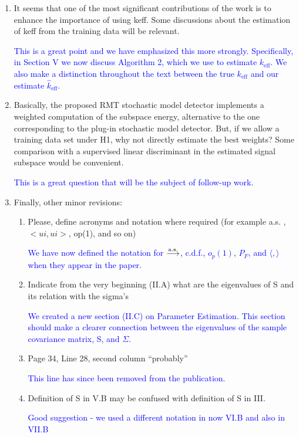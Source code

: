 \documentclass[11pt]{article}
\begin{document}
\begin{enumerate}
\item It seems that one of the most significant contributions of the work is to enhance the importance of using keff. Some discussions about the estimation of keff from the training data will be relevant.

\textcolor{blue}{This is a great point and we have emphasized this more strongly. Specifically, in Section V we now discuss Algorithm 2, which we use to estimate $k_{\text{eff}}$. We also make a distinction throughout the text between the true $k_{\text{eff}}$ and our estimate $\widehat{k}_{\text{eff}}$.}

\item Basically, the proposed RMT stochastic model detector implements a weighted computation of the subspace energy, alternative to the one corresponding to the plug-in stochastic model detector. But, if we allow a training data set under H1, why not directly estimate the best weights? Some comparison with a supervised linear discriminant in the estimated signal subspace would be convenient.

\textcolor{blue}{This is a great question that will be the subject of follow-up work.}

\item Finally, other minor revisions:
  \begin{enumerate}
  \item Please, define acronyms and notation where required (for example a.s. ,$ <ui,ui>$, op(1), and so on)

    \textcolor{blue}{We have now defined the notation for $\overset{\textrm{a.s.}}{\longrightarrow}$, c.d.f., $o_p(1)$, $P_F$, and $\langle ,\rangle$ when they appear in the paper.}

  \item  Indicate from the very beginning (II.A) what are the eigenvalues of S and its relation with the sigma’s

    \textcolor{blue}{We created a new section (II.C) on Parameter Estimation. This section should make a clearer connection between the eigenvalues of the sample covariance matrix, S, and $\Sigma$. }

  \item Page 34, Line 28, second column “probably”

    \textcolor{blue}{This line has since been removed from the publication.}

  \item Definition of S in V.B may be confused with definition of S in III.

    \textcolor{blue}{Good suggestion - we used a different notation in now VI.B and also in VII.B}


\end{enumerate}
\end{enumerate}
\end{document}
